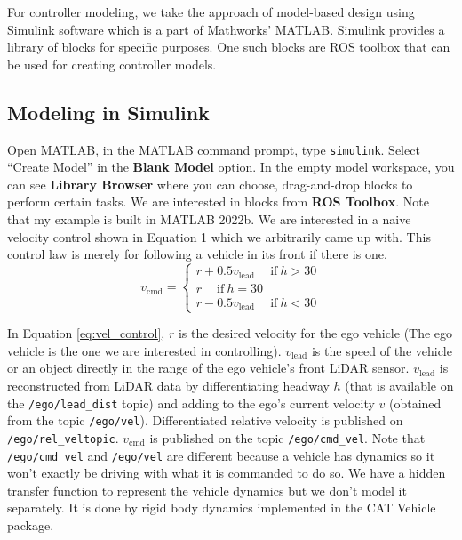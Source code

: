 \documentclass[
]{article}
\begin{document}
\label{sec:example}

For controller modeling, we take the approach of model-based design
using Simulink software which is a part of Mathworks' MATLAB. Simulink
provides a library of blocks for specific purposes. One such blocks are
ROS toolbox that can be used for creating controller models.

\hypertarget{modeling-in-simulink}{%
\subsection{Modeling in Simulink}\label{modeling-in-simulink}}

Open MATLAB, in the MATLAB command prompt, type \texttt{simulink}.
Select ``Create Model'' in the \textbf{Blank Model} option. In the empty
model workspace, you can see \textbf{Library Browser} where you can
choose, drag-and-drop blocks to perform certain tasks. We are interested
in blocks from \textbf{ROS Toolbox}. Note that my example is built in
MATLAB 2022b. We are interested in a naive velocity control shown in
Equation 1 which we arbitrarily came up with. This control law is merely
for following a vehicle in its front if there is one. \begin{equation}
\label{eq:vel_control}
v_{\textrm{cmd}} = \begin{cases}r + 0.5 v_{\textrm{lead}}\quad ~\textrm{if}~ h > 30 \\
r \quad ~\textrm{if}~ h = 30\\
r - 0.5 v_{\textrm{lead}}\quad ~\textrm{if}~ h < 30
\end{cases}
\end{equation}

In Equation \eqref{eq:vel_control}, \(r\) is the desired velocity for
the ego vehicle (The ego vehicle is the one we are interested in
controlling). \(v_{\textrm{lead}}\) is the speed of the vehicle or an
object directly in the range of the ego vehicle's front LiDAR sensor.
\(v_{\textrm{lead}}\) is reconstructed from LiDAR data by
differentiating headway \(h\) (that is available on the
\texttt{/ego/lead\_dist} topic) and adding to the ego's current velocity
\(v\) (obtained from the topic \texttt{/ego/vel}). Differentiated
relative velocity is published on \texttt{/ego/rel\_veltopic}.
\(v_{\textrm{cmd}}\) is published on the topic \texttt{/ego/cmd\_vel}.
Note that \texttt{/ego/cmd\_vel} and \texttt{/ego/vel} are different
because a vehicle has dynamics so it won't exactly be driving with what
it is commanded to do so. We have a hidden transfer function to
represent the vehicle dynamics but we don't model it separately. It is
done by rigid body dynamics implemented in the CAT Vehicle package.
\end{document}
